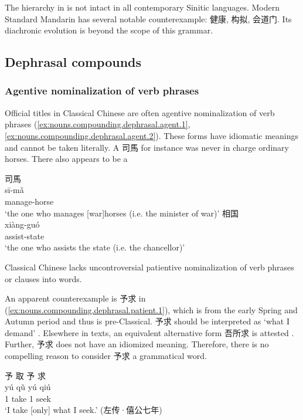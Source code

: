 \documentclass[UTF8, a4paper, oneside, scheme=plain, 12pt]{ctexrep}
\newcommand{\translate}[1]{`#1'}
\begin{document}
The hierarchy in  is not intact in all contemporary Sinitic languages.
Modern Standard Mandarin has several notable counterexample: 健康, 构拟, 会道门.
Its diachronic evolution is beyond the scope of this grammar.


\subsection{Dephrasal compounds}

\subsubsection{Agentive nominalization of verb phrases}

Official titles in Classical Chinese are often agentive nominalization of verb phrases
(\ref{ex:nouns.compounding.dephrasal.agent.1}, \ref{ex:nouns.compounding.dephrasal.agent.2}).
These forms have idiomatic meanings and cannot be taken literally.
A 司馬 for instance was never in charge ordinary horses.
There also appears to be a 

\begin{exe}
    \ex\label{ex:nouns.compounding.dephrasal.agent.1} 
    \glll 司馬 \\ 
    sī-mǎ \\ 
    manage-horse \\ 
    \glt\translate{the one who manages [war]horses (i.e. the minister of war)}
    \ex\label{ex:nouns.compounding.dephrasal.agent.2} 
    \glll 相国 \\
    xiàng-guó \\
    assist-state \\
    \glt\translate{the one who assists the state (i.e. the chancellor)}
\end{exe}

Classical Chinese lacks uncontroversial patientive nominalization of verb phrases or clauses into words. 

An apparent counterexample is 予求 in (\ref{ex:nouns.compounding.dephrasal.patient.1}), 
which is from the early Spring and Autumn period and thus is pre-Classical.
予求 should be interpreted as \translate{what I demand} \citep{qiu1983yuqiu}.
Elsewhere in texts, an equivalent alternative form 吾所求 is attested \citep{qiu1983yuqiu}.
Further, 予求 does not have an idiomized meaning.
Therefore, there is no compelling reason to consider 予求 a grammatical word.

\begin{exe}
    \ex\label{ex:nouns.compounding.dephrasal.patient.1}
    \glll 予 取 予 求 \\
    yú qǔ yú qiú \\
    1 take 1 seek \\
    \glt\translate{I take [only] what I seek.} \hfill (左传·僖公七年)
\end{exe}
\end{document}
